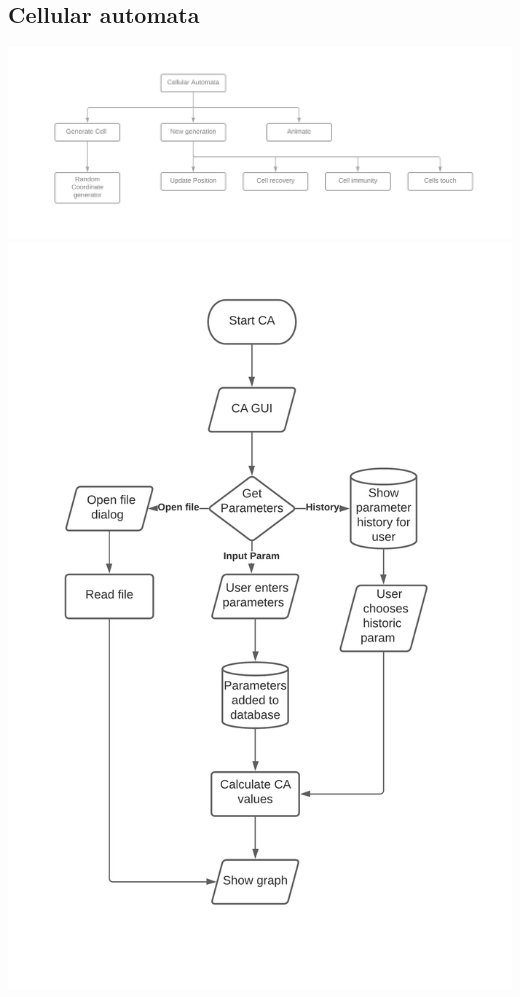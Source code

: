 \documentclass[11pt, a4paper]{article}
\begin{document}
\subsection{Cellular automata}
\includegraphics[width=\textwidth]{s_CA.png}
\newpage
\includegraphics[width=\textwidth, height=\textheight]{f_CA.png}
\newpage
\end{document}

